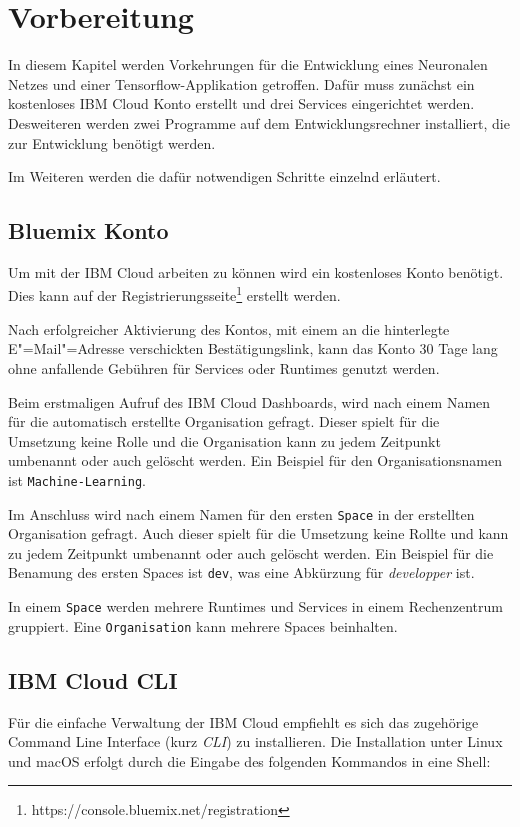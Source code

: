 \section{Vorbereitung}
In diesem Kapitel werden Vorkehrungen für die Entwicklung eines Neuronalen Netzes und einer Tensorflow-Applikation
getroffen. Dafür muss zunächst ein kostenloses IBM Cloud Konto erstellt und drei Services eingerichtet werden.
Desweiteren werden zwei Programme auf dem Entwicklungsrechner installiert, die zur Entwicklung benötigt werden.

Im Weiteren werden die dafür notwendigen Schritte einzelnd erläutert.

\subsection{Bluemix Konto}
Um mit der IBM Cloud arbeiten zu können wird ein kostenloses Konto benötigt. Dies kann auf der
Registrierungsseite\footnote{https://console.bluemix.net/registration} erstellt werden.

Nach erfolgreicher Aktivierung des Kontos, mit einem an die hinterlegte E"=Mail"=Adresse verschickten Bestätigungslink,
kann das Konto 30 Tage lang ohne anfallende Gebühren für Services oder Runtimes genutzt werden.

Beim erstmaligen Aufruf des IBM Cloud Dashboards, wird nach einem Namen für die automatisch erstellte Organisation
gefragt. Dieser spielt für die Umsetzung keine Rolle und die Organisation kann zu jedem Zeitpunkt umbenannt oder auch
gelöscht werden. Ein Beispiel für den Organisationsnamen ist \texttt{Machine-Learning}.

Im Anschluss wird nach einem Namen für den ersten \texttt{Space} in der erstellten Organisation gefragt. Auch dieser
spielt für die Umsetzung keine Rollte und kann zu jedem Zeitpunkt umbenannt oder auch gelöscht werden. Ein Beispiel für
die Benamung des ersten Spaces ist \texttt{dev}, was eine Abkürzung für \textit{developper} ist.

In einem \texttt{Space} werden mehrere Runtimes und Services in einem Rechenzentrum gruppiert. Eine \texttt{Organisation}
kann mehrere Spaces beinhalten.

\subsection{IBM Cloud CLI}
Für die einfache Verwaltung der IBM Cloud empfiehlt es sich das zugehörige Command Line Interface (kurz \textit{CLI}) zu
installieren. Die Installation unter Linux und macOS erfolgt durch die Eingabe des folgenden Kommandos in eine Shell:

